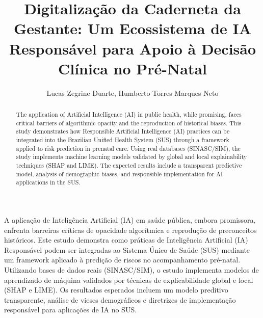 \documentclass[12pt]{article}
\title{Digitalização da Caderneta da Gestante: Um Ecossistema de IA Responsável para Apoio à Decisão Clínica no Pré-Natal}
\author{Lucas Zegrine Duarte\inst{1}, Humberto Torres Marques Neto\inst{1}}
\begin{document}
 

\maketitle


\begin{abstract}
  The application of Artificial Intelligence (AI) in public health, while promising, faces critical barriers of algorithmic opacity and the reproduction of historical biases. This study demonstrates how Responsible Artificial Intelligence (AI) practices can be integrated into the Brazilian Unified Health System (SUS) through a framework applied to risk prediction in prenatal care. Using real databases (SINASC/SIM), the study implements machine learning models validated by global and local explainability techniques (SHAP and LIME). The expected results include a transparent predictive model, analysis of demographic biases, and responsible implementation for AI applications in the SUS.
\end{abstract}
     
\begin{resumo} 
  A aplicação de Inteligência Artificial (IA) em saúde pública, embora promissora, enfrenta barreiras críticas de opacidade algorítmica e reprodução de preconceitos históricos. Este estudo demonstra como práticas de Inteligência Artificial (IA) Responsável podem ser integradas ao Sistema Único de Saúde (SUS) mediante um framework aplicado à predição de riscos no acompanhamento pré-natal. Utilizando bases de dados reais (SINASC/SIM), o estudo implementa modelos de aprendizado de máquina validados por técnicas de explicabilidade global e local (SHAP e LIME). Os resultados esperados incluem um modelo preditivo transparente, análise de vieses demográficos e diretrizes de implementação responsável para aplicações de IA no SUS.
\end{resumo}
\end{document}
